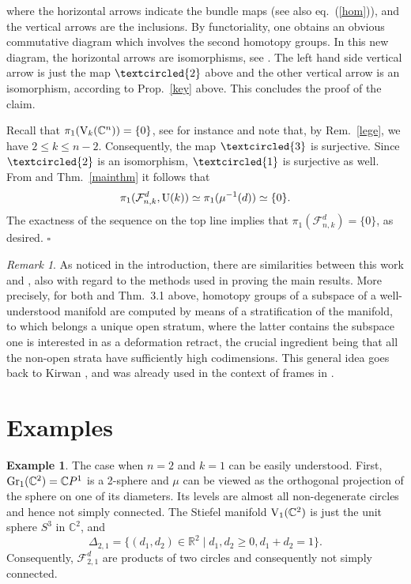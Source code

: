 \documentclass[12pt]{amsart}
\theoremstyle{definition}
\newtheorem{ex}[thm]{Example}
\theoremstyle{remark}
\newtheorem{rem}[thm]{Remark}
\newcommand{\RR}{\mathbb R}
\newcommand{\CC}{\mathbb C}
\begin{document}
\noindent where the horizontal arrows indicate the bundle maps (see also eq.~(\ref{hom})), and the vertical arrows are the inclusions.
By functoriality, one obtains an obvious commutative diagram which involves the second homotopy groups. In this new diagram, 
the horizontal arrows are isomorphisms, see \cite[Thm.~11.8]{Gray}. The left hand side vertical arrow is just the map 
$\textcircled{\small{2}}$ above and the other vertical arrow is an isomorphism, according to Prop.~\ref{key} above. This concludes the proof of the claim.

Recall that $\pi_1( {\rm V}_k(\CC^n))=\{0\}$, see for instance \cite[Thm.~3.15, p.~68]{MM} and note that, by Rem.~\ref{lege}, we have $2 \le k \le n-2$. 
Consequently, the map ${\textcircled{\small{3}}}$ is surjective. Since   ${\textcircled{\small{2}}}$ is an isomorphism, 
${\textcircled{\small{1}}}$ is surjective as well. 
From \cite[Thm.~11.8]{Gray} and Thm.~\ref{mainthm} it follows that 
$$\pi_1({\mathcal F}_{n,k}^d, {\rm U}(k)) \simeq \pi_1(\mu^{-1}(d))\simeq \{0\}.$$ The exactness of the sequence on the top line 
implies that $\pi_1({\mathcal F}_{n,k}^d)=\{0\}$, as desired.
$\square$

\begin{rem}  \label{meth} As noticed in the introduction, there are similarities between this work and \cite{CNS}, also with regard to the methods used in proving the main results. More precisely, for both \cite[Thm.~4.5]{CNS} and Thm.~3.1 above, homotopy groups of a  subspace of a well-understood manifold   are computed by means of a stratification of the manifold, to which belongs a unique open stratum, where the latter contains the subspace one is interested in as a deformation retract, the crucial ingredient being that all the non-open strata have sufficiently high codimensions. This general idea goes back to Kirwan \cite{Ki}, and was already used in the context of frames in \cite{Mare}. 
\end{rem}

\section{Examples} 


\begin{ex}\label{exa1} The case when $n=2$ and $k=1$ can be easily understood.    First, ${\rm Gr}_1(\CC^2)=\CC P^1$ is a 2-sphere and 
$\mu$ can be viewed as the orthogonal projection of the sphere on one of its diameters. Its levels are almost all  non-degenerate circles and hence not simply connected. The Stiefel manifold 
${\rm V}_1(\CC^2)$ is just the unit sphere
$S^3$ in $\CC^2$, and
$$\Delta_{2,1}=\{(d_1, d_2) \in \RR^2 \mid d_1, d_2 \ge 0, d_1+d_2=1\}.$$ Consequently, ${\mathcal F}_{2,1}^d$ are products of two circles and consequently not simply connected.
\end{ex}
\end{document}
